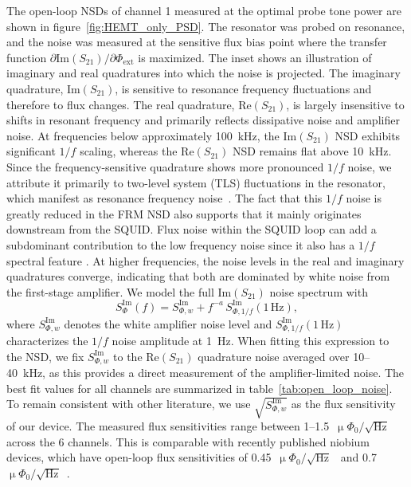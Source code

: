 \documentclass[10pt]{iopart}
\newcommand{\uPhirtHz}{$\upmu \Phi_0/\sqrt{\text{Hz}}$\xspace}
\begin{document}
The open-loop NSDs of channel 1 measured at the optimal probe tone power are shown in figure~\ref{fig:HEMT_only_PSD}. The resonator was probed on resonance, and the noise was measured at the sensitive flux bias point where the transfer function $\partial \mathrm{Im}(S_{21})/\partial \Phi_{\mathrm{ext}}$ is maximized. The inset shows an illustration of imaginary and real quadratures into which the noise is projected. The imaginary quadrature, $\mathrm{Im}(S_{21})$, is sensitive to resonance frequency fluctuations and therefore to flux changes. The real quadrature, $\mathrm{Re}(S_{21})$, is largely insensitive to shifts in resonant frequency and primarily reflects dissipative noise and amplifier noise. At frequencies below approximately \qty{100}{\kHz}, the $\mathrm{Im}(S_{21})$ NSD exhibits significant $1/f$ scaling, whereas the $\mathrm{Re}(S_{21})$ NSD remains flat above \qty{10}{\kHz}. Since the frequency-sensitive quadrature shows more pronounced $1/f$ noise, we attribute it primarily to two-level system (TLS) fluctuations in the resonator, which manifest as resonance frequency noise~\cite{gao_noise_2007, kumar_temperature_2008}. The fact that this $1/f$ noise is greatly reduced in the FRM NSD also supports that it mainly originates downstream from the SQUID. Flux noise within the SQUID loop can add a subdominant contribution to the low frequency noise since it also has a $1/f$ spectral feature \cite{wellstood_low-frequency_1987, rower_evolution_2023}. At higher frequencies, the noise levels in the real and imaginary quadratures converge, indicating that both are dominated by white noise from the first-stage amplifier. We model the full $\text{Im}(S_{21})$ noise spectrum with
\begin{equation}
S^{\mathrm{Im}}_{\Phi}(f) = S^{\mathrm{Im}}_{\Phi,w} + f^{-a} \, S^{\mathrm{Im}}_{\Phi,1/f}(1\,\mathrm{Hz}),
\end{equation}
where $S^{\mathrm{Im}}_{\Phi,w}$ denotes the white amplifier noise level and $S^{\mathrm{Im}}_{\Phi,1/f}(1\,\mathrm{Hz})$ characterizes the $1/f$ noise amplitude at \qty{1}{Hz}. When fitting this expression to the NSD, we fix $S^{\mathrm{Im}}_{\Phi,w}$ to the $\mathrm{Re}(S_{21})$ quadrature noise averaged over 10--\qty{40}{\kHz}, as this provides a direct measurement of the amplifier-limited noise. The best fit values for all channels are summarized in table~\ref{tab:open_loop_noise}. To remain consistent with other literature, we use $\sqrt{S^{\mathrm{Im}}_{\Phi,w}}$ as the flux sensitivity of our device. The measured flux sensitivities range between 1--1.5~\uPhirtHz across the 6 channels. This is comparable with recently published niobium devices, which have open-loop flux sensitivities of 0.45~\uPhirtHz~\cite{malnou_improved_2023} and 0.7~\uPhirtHz~\cite{neidig_full-scale_2025}.
\end{document}
